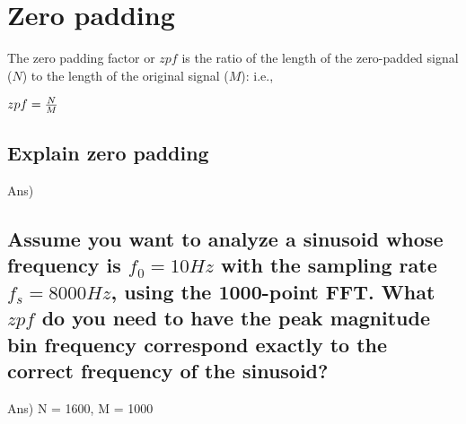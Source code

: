 \documentclass[12pt]{article}%
\begin{document}
\section{Zero padding}
The zero padding factor or $zpf$ is the ratio of the length of the zero-padded signal ($N$) to the length of the original signal ($M$): i.e.,\\
\begin{center}
    $zpf = {N \over M}$
\end{center}
\subsection{Explain zero padding}
Ans) 
\subsection{Assume you want to analyze a sinusoid whose frequency is $f_0=10 Hz$ with the sampling rate  $f_s=8000 Hz$, using the 1000-point FFT. What $zpf$ do you need to have the peak magnitude bin frequency correspond exactly to the correct frequency of the sinusoid?}
Ans) N = 1600, M = 1000
\end{document}
